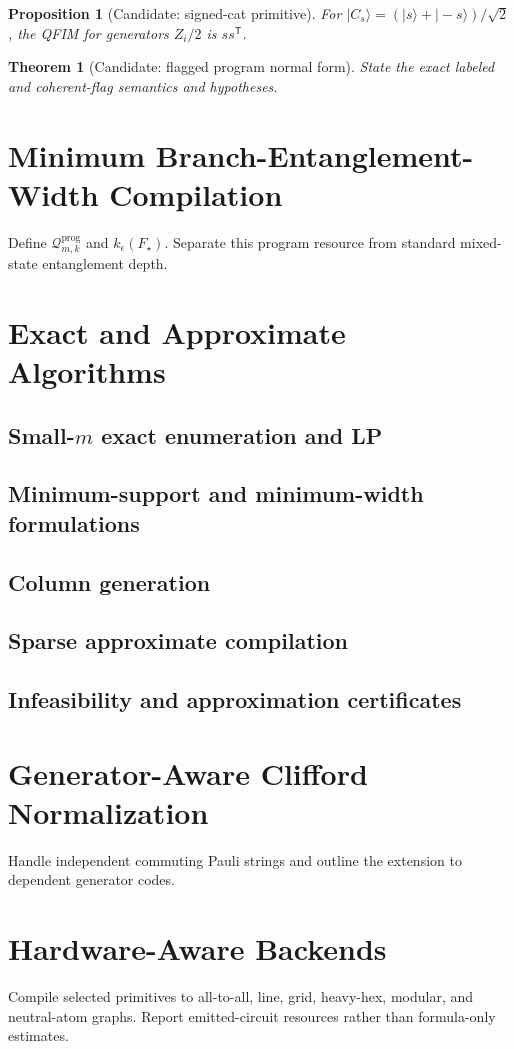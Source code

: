 \documentclass[11pt]{article}
\newtheorem{theorem}{Theorem}
\newtheorem{proposition}{Proposition}
\begin{document}
\begin{proposition}[Candidate: signed-cat primitive]
For $|C_s\rangle=(|s\rangle+|-s\rangle)/\sqrt2$, the QFIM for generators $Z_i/2$ is $ss^{\mathsf T}$.
\end{proposition}

\begin{theorem}[Candidate: flagged program normal form]
State the exact labeled and coherent-flag semantics and hypotheses.
\end{theorem}

\section{Minimum Branch-Entanglement-Width Compilation}
Define $\mathcal Q_{m,k}^{\mathrm{prog}}$ and $k_\epsilon(F_\star)$. Separate this program resource from standard mixed-state entanglement depth.

\section{Exact and Approximate Algorithms}
\subsection{Small-$m$ exact enumeration and LP}
\subsection{Minimum-support and minimum-width formulations}
\subsection{Column generation}
\subsection{Sparse approximate compilation}
\subsection{Infeasibility and approximation certificates}

\section{Generator-Aware Clifford Normalization}
Handle independent commuting Pauli strings and outline the extension to dependent generator codes.

\section{Hardware-Aware Backends}
Compile selected primitives to all-to-all, line, grid, heavy-hex, modular, and neutral-atom graphs. Report emitted-circuit resources rather than formula-only estimates.
\end{document}
